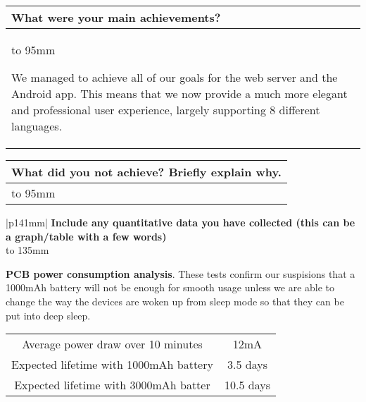 \documentclass[a4paper]{article}
\newcommand{\colWidth}{141mm}
\begin{document}
\begin{center}

\begin{tabular}{|p{\colWidth}|}
	\hline
	\cellcolor{blue!25}\large
	\textbf{What were your main achievements?}
	\\ \hline
	\vtop to 95mm{
		We managed to achieve all of our goals for the web server and the Android app.
		This means that we now provide a much more elegant and professional user experience,
		largely supporting 8 different languages.

  }
  \\
  \hline
\end{tabular}
\vskip 5mm


\begin{tabular}{|p{\colWidth}|}
	\hline
	\cellcolor{blue!25}\large
	\textbf{What did you not achieve? Briefly explain why.}
	\\ \hline
	\vtop to 95mm{

  }
  \\
  \hline
\end{tabular}
\vskip 5mm


\begin{tabular}{|p{\colWidth}|}
	\hline
	\large
	\textbf{Include any quantitative data you have collected (this can be a graph/table with a few words)}
	\\ \hline
	\vtop to 135mm{

	\textbf{PCB power consumption analysis}. These tests confirm our suspisions that a 1000mAh battery will not be enough for smooth usage unless
	we are able to change the way the devices are woken up from sleep mode so that they can be put into deep sleep.

	\vspace{3mm}

	\begin{tabular}{| c | c |} \hline
		Average power draw over 10 minutes & 12mA \\
		Expected lifetime with 1000mAh battery & 3.5 days \\
		Expected lifetime with 3000mAh batter & 10.5 days \\ \hline
	\end{tabular}

}
\end{tabular}
\end{center}
\end{document}
